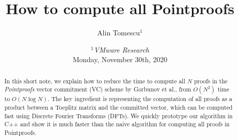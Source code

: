 \documentclass{llncs}
\title{\textbf{How to compute all Pointproofs}} %
\author{Alin Tomescu$^{1}$}
\date{%
{\small $^1$\textit{VMware Research}}\\[.5em]%
{\small Monday, November 30th, 2020}}
\author{}
\date{}                     %
\begin{document}
\maketitle

\ifEurocrypt
    \vspace{-5em}
\fi
\begin{abstract}
    In this short note, we explain how to reduce the time to compute all $N$ proofs in the \textit{Pointproofs} vector commitment (VC) scheme by Gorbunov et al., from $O(N^2)$ time to $O(N\log{N})$.
    The key ingredient is representing the computation of all proofs as a product between a Toeplitz matrix and the committed vector, which can be computed fast using Discrete Fourier Transforms (DFTs).
    We quickly prototype our algorithm in C++ and show it is much faster than the naive algorithm for computing all proofs in Pointproofs.
\end{abstract}








\ifEurocrypt
    
    {\footnotesize
    }
\else
    \clearpage
    
    
\fi


\ifNotEurocrypt
\fi
\end{document}
